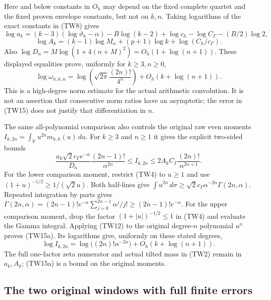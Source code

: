 \documentclass[11pt,a4paper]{article}
\begin{document}
Here and below constants in $O_h$ may depend on the fixed complete
quartet and the fixed proven envelope constants, but not on $k,n$.
Taking logarithms of the exact constants in (TW8) gives
\[
 \log a_k=(k-3)(\log\vartheta_h-\alpha)-B\log(k-2)
            +\log c_h-\log C_\Gamma-(B/2)\log2,
\]
\[
 \log A_k=(k-1)\log M_\alpha+(p+1)\log k
                       +\log(C_h/c_\Gamma).
\]
Also $\log D_n=M\log(1+4(n+M)^2)=O_h(1+\log(n+1))$.
These displayed equalities prove, uniformly for $k\geq3,n\geq0$,
\[
 \boxed{\log\omega_{h,k,n}=
 \log\!\left(\sqrt{2\pi}\frac{(2n)!}{4^n}\right)
 +O_h(k+\log(n+1)).}\tag{TW15}
\]
This is a high-degree norm estimate for the actual arithmetic convolution.
It is not an assertion that consecutive norm ratios have an asymptotic;
the error in (TW15) does not justify that differentiation in $n$.

The same all-polynomial comparison also controls the original raw even
moments $I_{k,2n}=\int_{\mathbb R}u^{2n}m_{h,k}(u)\,du$.  For
$k\geq3$ and $n\geq1$ it gives the explicit two-sided bounds
\[
 \boxed{
 \frac{a_k\sqrt2c_\Gamma e^{-\alpha}}{D_n}
       \frac{(2n-1)!}{\alpha^{2n}}
 \leq I_{k,2n}
 \leq2A_k C_\Gamma\frac{(2n)!}{\alpha^{2n+1}}.}
 \tag{TW15a}
\]
For the lower comparison moment, restrict (TW4) to $u\geq1$ and
use $(1+u)^{-1/2}\geq1/(\sqrt2u)$.  Both half-lines give
$\int u^{2n}\,d\sigma\geq\sqrt2c_\Gamma
\alpha^{-2n}\Gamma(2n,\alpha)$.
Repeated integration by parts gives
$\Gamma(2n,\alpha)=(2n-1)!e^{-\alpha}
\sum_{j=0}^{2n-1}\alpha^j/j!\geq(2n-1)!e^{-\alpha}$.
For the upper comparison moment, drop the factor
$(1+|u|)^{-1/2}\leq1$ in (TW4) and evaluate the Gamma integral.
Applying (TW12) to the original degree-$n$ polynomial $u^n$ proves
(TW15a).  Its logarithms give, uniformly on these stated degrees,
\[
 \log I_{k,2n}=\log\bigl((2n)!\alpha^{-2n}\bigr)
                    +O_h(k+\log(n+1)).\tag{TW15b}
\]
The full one-factor zeta numerator and actual tilted mass in (TW2)
remain in $a_k,A_k$; (TW15a) is a bound on the original moments.

\subsection{The two original windows with full finite errors}
\end{document}
